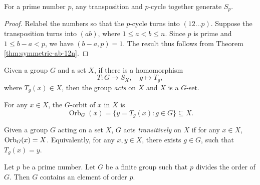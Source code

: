 \begin{theorem} \label{thm:symmetric-prime}
	For a prime number $p$, any transposition and $p$-cycle together generate $S_p$.
\end{theorem}
\begin{proof}
	Relabel the numbers so that the $p$-cycle turns into $(12 \dots p)$. Suppose the transposition turns into $(ab)$, where $1 \le a < b \le n$. Since $p$ is prime and $1 \le b - a < p$, we have $(b - a, p) = 1$. The result thus follows from Theorem \ref{thm:symmetric-ab-12n}.
\end{proof}






\begin{definition} \label{def:action}
	Given a group $G$ and a set $X$, if there is a homomorphism
	$$
	T: G \rightarrow S_X, \quad g \mapsto T_g,
	$$
	where $T_g(x) \in X$, then the group \textit{acts} on $X$ and $X$ is a $G$-set. 
\end{definition}

\begin{definition}
	For any $x \in X$, the $G$-orbit of $x$ in $X$ is
	$$\operatorname{Orb}_G(x) = \{ y = T_g(x) : g \in G \} \subseteq X.$$

	
\end{definition}

\begin{definition} \label{def:transitive-action}
	Given a group $G$ acting on a set $X$, $G$ acts \textit{transitively} on $X$ if for any $x \in X$, $\operatorname{Orb}_G(x) = X$. Equivalently, for any $x, y\in X$, there exists $g \in G$, such that $T_g(x) = y$. 
\end{definition}

\begin{theorem} \label{thm:cauchy}
	Let $p$ be a prime number. Let $G$ be a finite group such that $p$ divides the order of $G$. Then $G$ contains an element of order $p$. 
\end{theorem}

